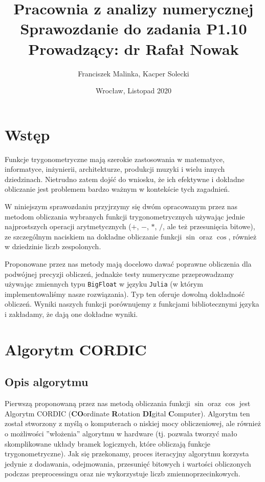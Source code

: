 \documentclass[12pt]{extarticle}
\title{Pracownia z analizy numerycznej \\
        \large Sprawozdanie do zadania \textbf{P1.10} \\
        Prowadzący: dr Rafał Nowak}
\author{Franciszek Malinka, Kacper Solecki}
\date{Wrocław, Listopad 2020}
\theoremstyle{remark}
\theoremstyle{definition}
\theoremstyle{definition}
\begin{document}
\maketitle

\section{Wstęp}
Funkcje trygonometryczne mają szerokie zastosowania w matematyce, informatyce, inżynierii, architekturze, produkcji muzyki i wielu innych dziedzinach. Nietrudno zatem dojść do wniosku, że ich efektywne i dokładne obliczanie jest problemem bardzo ważnym w kontekście tych zagadnień.

W niniejszym sprawozdaniu przyjrzymy się dwóm opracowanym przez nas metodom obliczania wybranych funkcji trygonometrycznych używając jednie najprostszych operacji arytmetycznych ($+$, $-$, $*$, $/$, ale też przesunięcia bitowe), ze szczególnym naciskiem na dokładne obliczanie funkcji $\sin$ oraz $\cos$, również w dziedzinie liczb zespolonych.

Proponowane przez nas metody mają docelowo dawać poprawne obliczenia dla podwójnej precyzji obliczeń, jednakże testy numeryczne przeprowadzamy używając zmiennych typu \texttt{BigFloat} w języku \texttt{Julia} (w którym implementowaliśmy nasze rozwiązania). Typ ten oferuje dowolną dokładność obliczeń. Wyniki naszych funkcji porównujemy z funkcjami bibliotecznymi języka i zakładamy, że dają one dokładne wyniki.

\section{Algorytm CORDIC}
\subsection{Opis algorytmu}

Pierwszą proponowaną przez nas metodą obliczania funkcji $\sin$ oraz $\cos$ jest Algorytm CORDIC (\textbf{CO}ordinate \textbf{R}otation \textbf{DI}gital \textbf{C}omputer). Algorytm ten został stworzony z myślą o komputerach o niskiej mocy obliczeniowej, ale również o możliwości ''włożenia'' algorytmu w hardware (tj. pozwala tworzyć mało skomplikowane układy bramek logicznych, które obliczają funkcje trygonometryczne). Jak się przekonamy, proces iteracyjny algorytmu korzysta jedynie z dodawania, odejmowania, przesunięć bitowych i wartości obliczonych podczas preprocessingu oraz nie wykorzystuje liczb zmiennoprzecinkowych.
\end{document}
